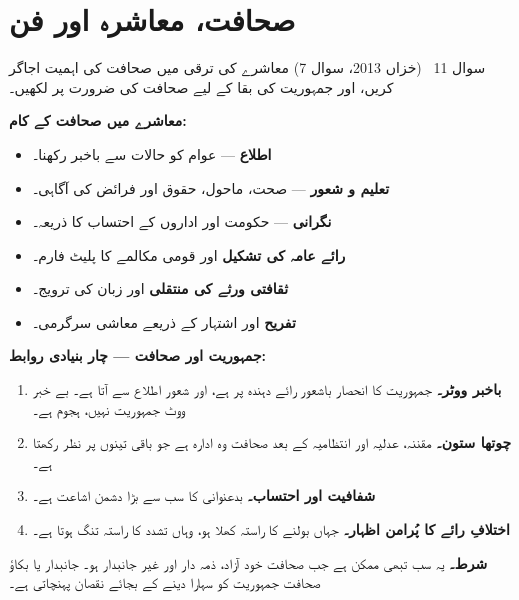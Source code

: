 \section*{صحافت، معاشرہ اور فن}

\begin{sawal}{سوال \textenglish{11} \ \textnormal{\small(خزاں \textenglish{2013}، سوال \textenglish{7})}}
معاشرے کی ترقی میں صحافت کی اہمیت اجاگر کریں، اور جمہوریت کی بقا کے لیے صحافت
کی ضرورت پر لکھیں۔
\end{sawal}

\begin{hal}
\textbf{معاشرے میں صحافت کے کام:}
\begin{itemize}\setlength{\itemsep}{1pt}
  \item \textbf{اطلاع} --- عوام کو حالات سے باخبر رکھنا۔
  \item \textbf{تعلیم و شعور} --- صحت، ماحول، حقوق اور فرائض کی آگاہی۔
  \item \textbf{نگرانی} --- حکومت اور اداروں کے احتساب کا ذریعہ۔
  \item \textbf{رائے عامہ کی تشکیل} اور قومی مکالمے کا پلیٹ فارم۔
  \item \textbf{ثقافتی ورثے کی منتقلی} اور زبان کی ترویج۔
  \item \textbf{تفریح} اور اشتہار کے ذریعے معاشی سرگرمی۔
\end{itemize}

\medskip
\textbf{جمہوریت اور صحافت --- چار بنیادی روابط:}
\begin{enumerate}\setlength{\itemsep}{1pt}
  \item \textbf{باخبر ووٹر۔} جمہوریت کا انحصار باشعور رائے دہندہ پر ہے، اور
        شعور اطلاع سے آتا ہے۔ بے خبر ووٹ جمہوریت نہیں، ہجوم ہے۔
  \item \textbf{چوتھا ستون۔} مقننہ، عدلیہ اور انتظامیہ کے بعد صحافت وہ ادارہ
        ہے جو باقی تینوں پر نظر رکھتا ہے۔
  \item \textbf{شفافیت اور احتساب۔} بدعنوانی کا سب سے بڑا دشمن اشاعت ہے۔
  \item \textbf{اختلافِ رائے کا پُرامن اظہار۔} جہاں بولنے کا راستہ کھلا ہو،
        وہاں تشدد کا راستہ تنگ ہوتا ہے۔
\end{enumerate}

\medskip
\textbf{شرط۔} یہ سب تبھی ممکن ہے جب صحافت خود آزاد، ذمہ دار اور غیر جانبدار
ہو۔ جانبدار یا بکاؤ صحافت جمہوریت کو سہارا دینے کے بجائے نقصان پہنچاتی ہے۔

\end{hal}


